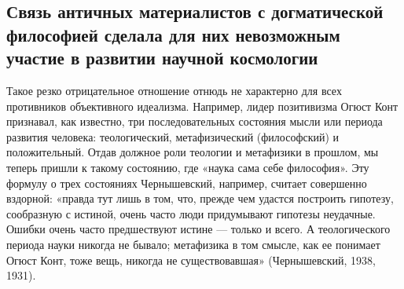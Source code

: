 \subsection{Связь  античных материалистов  с догматической  философией
сделала для них невозможным участие в развитии научной космологии}

Такое  резко отрицательное  отношение  отнюдь не  характерно для  всех
противников объективного идеализма.  Например, лидер позитивизма Огюст
Конт признавал, как известно, три последовательных состояния мысли или
периода развития человека: теологический, метафизический (философский)
и положительный. Отдав  должное роли теологии и  метафизики в прошлом,
мы теперь пришли к такому  состоянию, где «наука сама себе философия».
Эту  формулу   о  трех  состояниях  Чернышевский,   например,  считает
совершенно вздорной: «правда  тут лишь в том, что,  прежде чем удастся
построить гипотезу, сообразную с истиной, очень часто люди придумывают
гипотезы неудачные. Ошибки очень  часто предшествуют истине --- только
и всего. А теологического периода  науки никогда не бывало; метафизика
в  том смысле,  как  ее понимает  Огюст Конт,  тоже  вещь, никогда  не
существовавшая» (Чернышевский, 1938, 1931).

